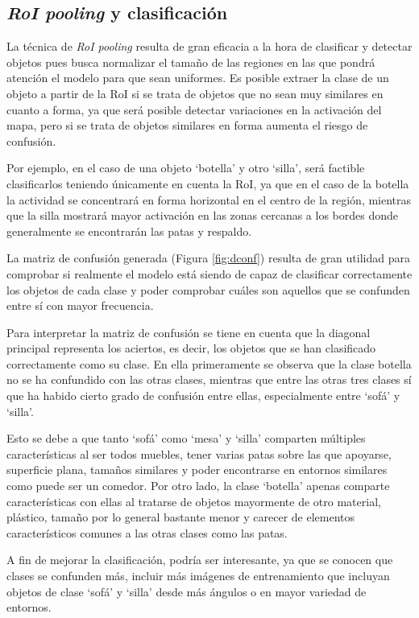\subsection {\textit{RoI pooling} y clasificación}
    La técnica de \textit{RoI pooling} resulta de gran eficacia a la hora de clasificar y detectar objetos pues busca normalizar el tamaño de las regiones en las que pondrá atención el modelo para que sean uniformes. Es posible extraer la clase de un objeto a partir de la RoI si se trata de objetos que no sean muy similares en cuanto a forma, ya que será posible detectar variaciones en la activación del mapa, pero si se trata de objetos similares en forma aumenta el riesgo de confusión.

    Por ejemplo, en el caso de una objeto `botella' y otro `silla', será factible clasificarlos teniendo únicamente en cuenta la RoI, ya que en el caso de la botella la actividad se concentrará en forma horizontal en el centro de la región, mientras que la silla mostrará mayor activación en las zonas cercanas a los bordes donde generalmente se encontrarán las patas y respaldo.

    La matriz de confusión generada (Figura \ref{fig:dconf}) resulta de gran utilidad para comprobar si realmente el modelo está siendo de capaz de clasificar correctamente los objetos de cada clase y poder comprobar cuáles son aquellos que se confunden entre sí con mayor frecuencia.


    Para interpretar la matriz de confusión se tiene en cuenta que la diagonal principal representa los aciertos, es decir, los objetos que se han clasificado correctamente como su clase. En ella primeramente se observa que la clase botella no se ha confundido con las otras clases, mientras que entre las otras tres clases sí que ha habido cierto grado de confusión entre ellas, especialmente entre `sofá' y `silla'.

    Esto se debe a que tanto `sofá' como `mesa' y `silla' comparten múltiples características al ser todos muebles, tener varias patas sobre las que apoyarse, superficie plana, tamaños similares y poder encontrarse en entornos similares como puede ser un comedor. Por otro lado, la clase `botella' apenas comparte características con ellas al tratarse de objetos mayormente de otro material, plástico, tamaño por lo general bastante menor y carecer de elementos característicos comunes a las otras clases como las patas.

    A fin de mejorar la clasificación, podría ser interesante, ya que se conocen que clases se confunden más, incluir más imágenes de entrenamiento que incluyan objetos de clase `sofá' y `silla' desde más ángulos o en mayor variedad de entornos.



